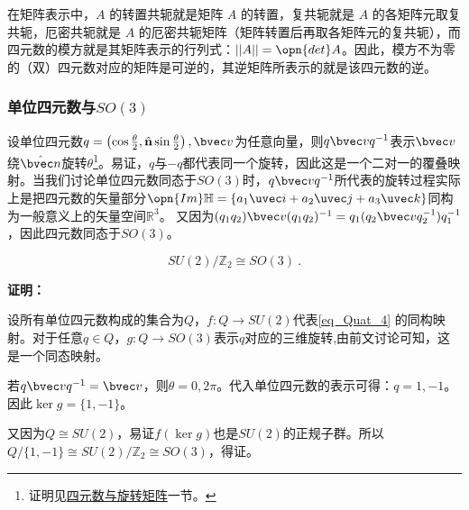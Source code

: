 在矩阵表示中，$A$ 的转置共轭就是矩阵 $A$ 的转置，复共轭就是 $A$ 的各矩阵元取复共轭，厄密共轭就是 $A$ 的厄密共轭矩阵（矩阵转置后再取各矩阵元的复共轭），而四元数的模方就是其矩阵表示的行列式：$||A||=\opn{det}A$。因此，模方不为零的（双）四元数对应的矩阵是可逆的，其逆矩阵所表示的就是该四元数的逆。
\subsubsection{单位四元数与$SO(3)$}
设单位四元数$q=\left(\cos\frac{\theta}{2},\hat{\mathbf{n}}\sin\frac{\theta}{2}\right),\bvec v$为任意向量，则$q\bvec vq^{-1}$表示$\bvec v$绕$\hat {\bvec n}$旋转$\theta$\footnote{证明见\href{https://wuli.wiki/online/QuatN.html}{四元数与旋转矩阵}一节。}。易证，$q$与$-q$都代表同一个旋转，因此这是一个二对一的覆叠映射。当我们讨论单位四元数同态于$SO(3)$时，$q\bvec v q^{-1}$所代表的旋转过程实际上是把四元数的矢量部分$\opn{Im}\mathbb H=\{a_1\uvec i+a_2\uvec j+ a_3\uvec k\}$同构为一般意义上的矢量空间$\mathbb R^3$。
又因为$(q_1q_2)\bvec v (q_1q_2)^{-1}=q_1(q_2\bvec v q_2^{-1})q_1^{-1}$，因此四元数同态于$SO(3)$。
\begin{corollary}{}

\begin{equation}
SU(2)/\mathbb{Z}_2\cong SO(3)~.
\end{equation}
\end{corollary}
\textbf{证明：}

设所有单位四元数构成的集合为$Q$，$f:Q\to SU(2)$代表\autoref{eq_Quat_4} 的同构映射。对于任意$q\in Q$，$g:Q\to SO(3)$表示$q$对应的三维旋转,由前文讨论可知，这是一个同态映射。

若$q\bvec vq^{-1}=\bvec v$，则$\theta=0,2\pi$。代入单位四元数的表示可得：$q=1,-1$。因此$\ker g=\{1,-1\}$。

又因为$Q\cong SU(2)$，易证$f(\ker g)$也是$SU(2)$的正规子群。所以$Q/\{1,-1\}\cong SU(2)/\mathbb Z_2\cong SO(3)$，得证。

